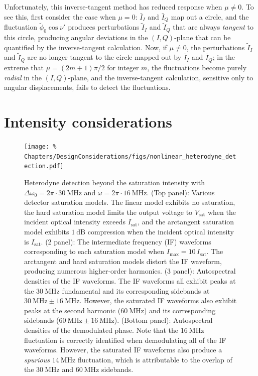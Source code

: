 Unfortunately, this inverse-tangent method
has reduced response when $\mu \neq 0$.
To see this, first consider the case when $\mu = 0$:
$\bar{I}_I$ and $\bar{I}_Q$ map out a circle, and
the fluctuation $\tilde{\phi}_0 \cos\nu'$
produces perturbations $\tilde{I}_I$ and $\tilde{I}_Q$
that are always \emph{tangent} to this circle,
producing angular deviations in the $(I, Q)$-plane
that can be quantified by the inverse-tangent calculation.
Now, if $\mu \neq 0$, the perturbations $\tilde{I}_I$ and $\tilde{I}_Q$
are no longer tangent to the circle mapped out by $\bar{I}_I$ and $\bar{I}_Q$;
in the extreme that $\mu = (2m + 1) \pi / 2$ for integer $m$,
the fluctuations become purely \emph{radial} in the $(I, Q)$-plane, and
the inverse-tangent calculation, sensitive only to angular displacements,
fails to detect the fluctuations.


\section{Intensity considerations}
\label{sec:DesignConsiderations:intensity}
\begin{figure}
  \centering
  \texttt{[image: \%
    Chapters/DesignConsiderations/figs/nonlinear\_heterodyne\_detection.pdf]}
  \caption[Heterodyne detection beyond the saturation intensity]{%
    Heterodyne detection beyond the saturation intensity with
    $\Delta\omega_0 = 2\pi \cdot \SI{30}{\mega\hertz}$ and
    $\omega = 2 \pi \cdot \SI{16}{\mega\hertz}$.
    (Top panel): Various detector saturation models.
    The linear model exhibits no saturation,
    the hard saturation model limits the output voltage
    to $V_{\text{sat}}$ when the incident optical intensity
    exceeds $I_{\text{sat}}$, and
    the arctangent saturation model exhibits $\SI{1}{\deci\bel}$ compression
    when the incident optical intensity is $I_{\text{sat}}$.
    (2 panel): The intermediate frequency (IF) waveforms
    corresponding to each saturation model when
    $I_{\text{max}} = 10 \, I_{\text{sat}}$.
    The arctangent and hard saturation models distort the IF waveform,
    producing numerous higher-order harmonics.
    (3 panel): Autospectral densities of the IF waveforms.
    The IF waveforms all exhibit peaks at
    the $\SI{30}{\mega\hertz}$ fundamental and
    its corresponding sidebands at
    $\SI{30}{\mega\hertz} \pm \SI{16}{\mega\hertz}$.
    However, the saturated IF waveforms
    also exhibit peaks at the second harmonic ($\SI{60}{\mega\hertz}$)
    and its corresponding sidebands
    ($\SI{60}{\mega\hertz} \pm \SI{16}{\mega\hertz}$).
    (Bottom panel): Autospectral densities of the demodulated phase.
    Note that the $\SI{16}{\mega\hertz}$ fluctuation is correctly identified
    when demodulating all of the IF waveforms.
    However, the saturated IF waveforms also produce
    a \emph{spurious} $\SI{14}{\mega\hertz}$ fluctuation,
    which is attributable to the overlap of
    the $\SI{30}{\mega\hertz}$ and $\SI{60}{\mega\hertz}$ sidebands.
  }
\label{fig:DesignConsiderations:nonlinear_heterodyne_detection}
\end{figure}

